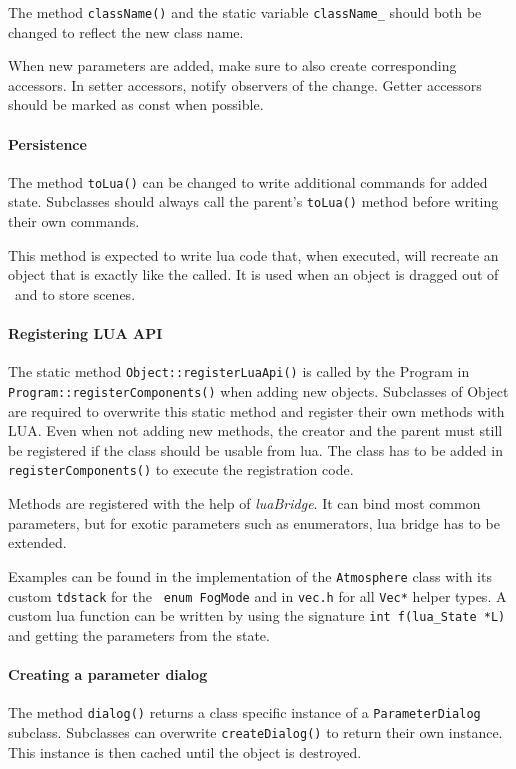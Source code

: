 The method \lstinline{className()} and the static variable \lstinline{className_} should both be changed to reflect the new class name.

When new parameters are added, make sure to also create corresponding accessors.
In setter accessors, notify observers of the change.
Getter accessors should be marked as const when possible.

\paragraph{Persistence}
The method \lstinline{toLua()} can be changed to write additional commands for added state.
Subclasses should always call the parent's \lstinline{toLua()} method before writing their own commands.

This method is expected to write lua code that, when executed, will recreate an object that is exactly like the called.
It is used when an object is dragged out of \ER\ and to store scenes.

\paragraph{Registering LUA API}
The static method \lstinline{Object::registerLuaApi()} is called by the Program in \lstinline{Program::registerComponents()} when adding new objects.
Subclasses of Object are required to overwrite this static method and register their own methods with LUA.
Even when not adding new methods, the creator and the parent must still be registered if the class should be usable from lua.
The class has to be added in \lstinline{registerComponents()} to execute the registration code.

Methods are registered with the help of \textit{luaBridge}.
It can bind most common parameters, but for exotic parameters such as enumerators, lua bridge has to be extended.

Examples can be found in the implementation of the \lstinline{Atmosphere} class with its custom \lstinline{tdstack} for the \lstinline{ enum FogMode}
and in \texttt{vec.h} for all \lstinline{Vec*} helper types.
A custom lua function can be written by using the signature \lstinline{int f(lua_State *L)} and getting the parameters from the state.

\paragraph{Creating a parameter dialog}
The method \lstinline{dialog()} returns a class specific instance of a \lstinline{ParameterDialog} subclass.
Subclasses can overwrite \lstinline{createDialog()} to return their own instance.
This instance is then cached until the object is destroyed.

